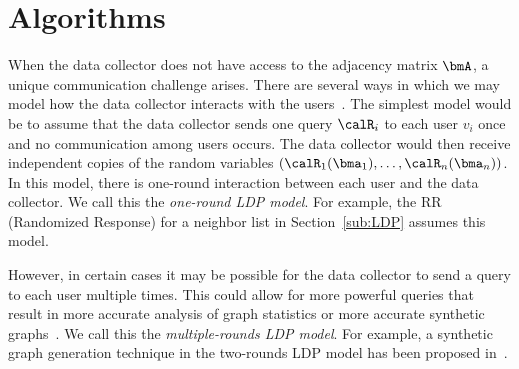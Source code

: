 \section{Algorithms}
\label{sec:algorithms}
When the data collector does not have access to the adjacency matrix
$\bmA$, a unique communication challenge arises. There are several ways in
which we may model how the data collector interacts with the users~\cite{Duchi_FOCS13,Joseph_SODA20,Qin_CCS17}.
The simplest model would be to assume that 
the data collector sends 
one query $\calR_i$ to each user $v_i$ once 
and no communication among users occurs.
The data collector would then receive independent copies of the random variables
$(\calR_1(\bma_1), \ldots, \calR_n(\bma_n))$. 
In this model, there is one-round interaction between each user and the data collector. 
We call this the
\textit{one-round LDP model}. 
For example, the RR (Randomized Response) for a neighbor list in Section~\ref{sub:LDP} assumes this model.

However, in certain cases it may be possible 
for the data collector to send a query to each user multiple times. 
This could allow for more powerful queries that result in more accurate analysis
of graph statistics or more accurate synthetic graphs~\cite{Qin_CCS17}. 
We call this the \textit{multiple-rounds LDP model}. 
For example, a synthetic graph generation technique in the two-rounds LDP model has been proposed in~\cite{Qin_CCS17}.


% 


